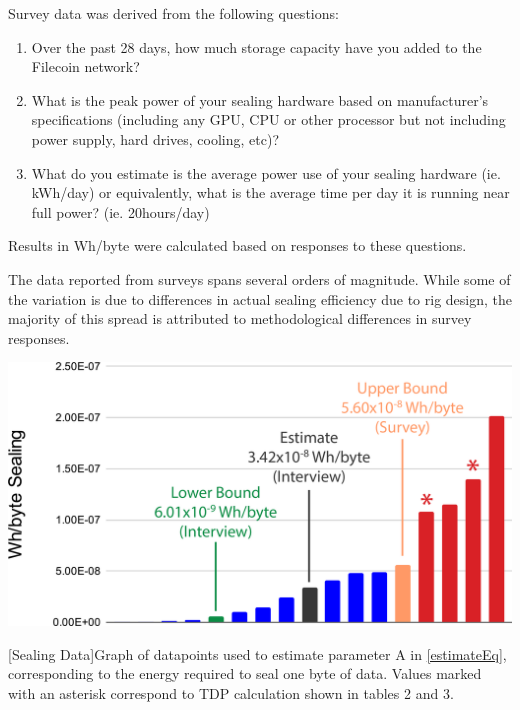 \documentclass[9pt, oneside]{article}   	%
\begin{document}
\begin{multicols}{2}
Survey data was derived from the following questions:

\begin{enumerate}
\item Over the past 28 days, how much storage capacity have you added to the Filecoin network?
\item What is the peak power of your sealing hardware based on manufacturer’s specifications (including any GPU, CPU or other processor but not including power supply, hard drives, cooling, etc)?
\item What do you estimate is the average power use of your sealing hardware (ie. kWh/day) or equivalently, what is the average time per day it is running near full power? (ie. 20hours/day)
\end{enumerate}

Results in Wh/byte were calculated based on responses to these questions. 

The data reported from surveys spans several orders of magnitude. While some of the variation is due to differences in actual sealing efficiency due to rig design, the majority of this spread is attributed to methodological differences in survey responses.

\end{multicols}
\begin{center}
\includegraphics[width=.8\columnwidth]{20211023_SealingValues}
\begin{flushleft}
[Sealing Data]{Graph of datapoints used to estimate parameter A in \ref{estimateEq}, corresponding to the energy required to seal one byte of data. Values marked with an asterisk correspond to TDP calculation shown in tables 2 and 3.}
\label{sealingenergyfigure}
\end{flushleft}
\end{center}
\end{document}
